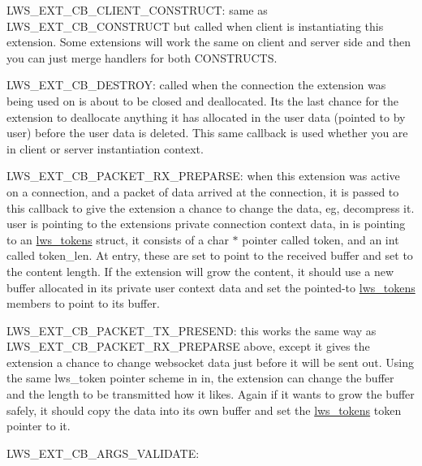 L\+W\+S\+\_\+\+E\+X\+T\+\_\+\+C\+B\+\_\+\+C\+L\+I\+E\+N\+T\+\_\+\+C\+O\+N\+S\+T\+R\+U\+CT\+: same as L\+W\+S\+\_\+\+E\+X\+T\+\_\+\+C\+B\+\_\+\+C\+O\+N\+S\+T\+R\+U\+CT but called when client is instantiating this extension. Some extensions will work the same on client and server side and then you can just merge handlers for both C\+O\+N\+S\+T\+R\+U\+C\+TS.

L\+W\+S\+\_\+\+E\+X\+T\+\_\+\+C\+B\+\_\+\+D\+E\+S\+T\+R\+OY\+: called when the connection the extension was being used on is about to be closed and deallocated. It\textquotesingle{}s the last chance for the extension to deallocate anything it has allocated in the user data (pointed to by user) before the user data is deleted. This same callback is used whether you are in client or server instantiation context.

L\+W\+S\+\_\+\+E\+X\+T\+\_\+\+C\+B\+\_\+\+P\+A\+C\+K\+E\+T\+\_\+\+R\+X\+\_\+\+P\+R\+E\+P\+A\+R\+SE\+: when this extension was active on a connection, and a packet of data arrived at the connection, it is passed to this callback to give the extension a chance to change the data, eg, decompress it. user is pointing to the extension\textquotesingle{}s private connection context data, in is pointing to an \hyperlink{structlws__tokens}{lws\+\_\+tokens} struct, it consists of a char $\ast$ pointer called token, and an int called token\+\_\+len. At entry, these are set to point to the received buffer and set to the content length. If the extension will grow the content, it should use a new buffer allocated in its private user context data and set the pointed-\/to \hyperlink{structlws__tokens}{lws\+\_\+tokens} members to point to its buffer.

L\+W\+S\+\_\+\+E\+X\+T\+\_\+\+C\+B\+\_\+\+P\+A\+C\+K\+E\+T\+\_\+\+T\+X\+\_\+\+P\+R\+E\+S\+E\+ND\+: this works the same way as L\+W\+S\+\_\+\+E\+X\+T\+\_\+\+C\+B\+\_\+\+P\+A\+C\+K\+E\+T\+\_\+\+R\+X\+\_\+\+P\+R\+E\+P\+A\+R\+SE above, except it gives the extension a chance to change websocket data just before it will be sent out. Using the same lws\+\_\+token pointer scheme in in, the extension can change the buffer and the length to be transmitted how it likes. Again if it wants to grow the buffer safely, it should copy the data into its own buffer and set the \hyperlink{structlws__tokens}{lws\+\_\+tokens} token pointer to it.

L\+W\+S\+\_\+\+E\+X\+T\+\_\+\+C\+B\+\_\+\+A\+R\+G\+S\+\_\+\+V\+A\+L\+I\+D\+A\+TE\+: \mbox{\label{group__extensions_gaae7169b2cd346b34fa33d0250db2afd0}} 
